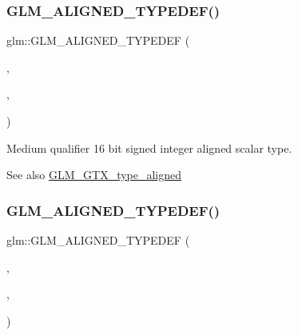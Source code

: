 \subsubsection{\texorpdfstring{G\+L\+M\+\_\+\+A\+L\+I\+G\+N\+E\+D\+\_\+\+T\+Y\+P\+E\+D\+E\+F()}{GLM\_ALIGNED\_TYPEDEF()}\hspace{0.1cm}{\footnotesize\ttfamily [22/209]}}
{\footnotesize\ttfamily glm\+::\+G\+L\+M\+\_\+\+A\+L\+I\+G\+N\+E\+D\+\_\+\+T\+Y\+P\+E\+D\+EF (\begin{DoxyParamCaption}\item[{\hyperlink{group__gtc__type__precision_ga8454fc6a82c7bb787d0ac9663e08f63d}{mediump\+\_\+i16}}]{,  }\item[{aligned\+\_\+mediump\+\_\+i16}]{,  }\item[{2}]{ }\end{DoxyParamCaption})}

Medium qualifier 16 bit signed integer aligned scalar type. \begin{DoxySeeAlso}{See also}
\hyperlink{group__gtx__type__aligned}{G\+L\+M\+\_\+\+G\+T\+X\+\_\+type\+\_\+aligned} 
\end{DoxySeeAlso}
\mbox{\label{group__gtx__type__aligned_ga63b882e29170d428463d99c3d630acc6}} 
\subsubsection{\texorpdfstring{G\+L\+M\+\_\+\+A\+L\+I\+G\+N\+E\+D\+\_\+\+T\+Y\+P\+E\+D\+E\+F()}{GLM\_ALIGNED\_TYPEDEF()}\hspace{0.1cm}{\footnotesize\ttfamily [23/209]}}
{\footnotesize\ttfamily glm\+::\+G\+L\+M\+\_\+\+A\+L\+I\+G\+N\+E\+D\+\_\+\+T\+Y\+P\+E\+D\+EF (\begin{DoxyParamCaption}\item[{\hyperlink{group__gtc__type__precision_ga5e00ec824eb55968a6b6496f294d8c07}{mediump\+\_\+i32}}]{,  }\item[{aligned\+\_\+mediump\+\_\+i32}]{,  }\item[{4}]{ }\end{DoxyParamCaption})}

